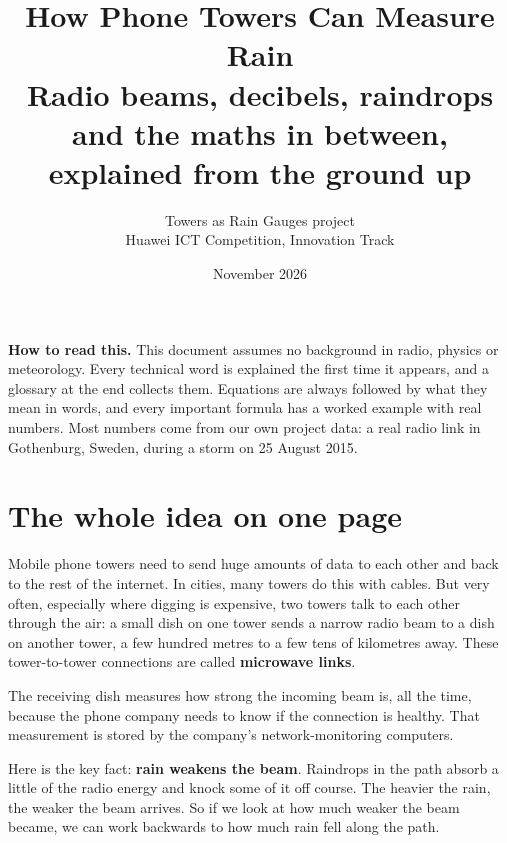 \documentclass[11pt,a4paper]{article}
\title{\textbf{How Phone Towers Can Measure Rain}\\[0.4em]
\large Radio beams, decibels, raindrops and the maths in between, explained from the ground up}
\author{Towers as Rain Gauges project\\\small Huawei ICT Competition, Innovation Track}
\date{November 2026}
\begin{document}
\maketitle

\begin{center}
\begin{minipage}{0.86\textwidth}
\small
\textbf{How to read this.} This document assumes no background in radio, physics or meteorology.
Every technical word is explained the first time it appears, and a glossary at the end collects them.
Equations are always followed by what they mean in words, and every important formula has a worked
example with real numbers. Most numbers come from our own project data: a real radio link in
Gothenburg, Sweden, during a storm on 25 August 2015.
\end{minipage}
\end{center}

\tableofcontents
\newpage

\section{The whole idea on one page}

Mobile phone towers need to send huge amounts of data to each other and back to the rest of
the internet. In cities, many towers do this with cables. But very often, especially where
digging is expensive, two towers talk to each other through the air: a small dish on one tower
sends a narrow radio beam to a dish on another tower, a few hundred metres to a few tens of
kilometres away. These tower-to-tower connections are called \textbf{microwave links}.

The receiving dish measures how strong the incoming beam is, all the time, because the phone
company needs to know if the connection is healthy. That measurement is stored by the company's
network-monitoring computers.

Here is the key fact: \textbf{rain weakens the beam}. Raindrops in the path absorb a little of the
radio energy and knock some of it off course. The heavier the rain, the weaker the beam
arrives. So if we look at how much weaker the beam became, we can work backwards to how much rain
fell along the path.
\end{document}
